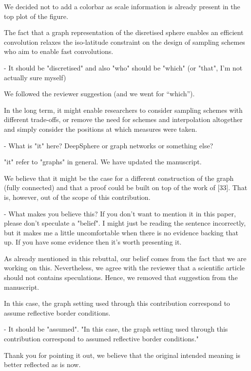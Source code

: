 \documentclass[12pt,a4paper]{article}
\newcommand{\nati}[1]{{\color[rgb]{.1,.6,.1}{NP: #1}}}
\newcommand{\TK}[1]{{\color{red}{TK: #1}}}
\newcommand{\todo}[1]{{\color[rgb]{.6,.1,.6}{TODO: #1}}}
\newcommand{\1}{\b{1}}              %
\newcommand{\0}{\b{0}}              %
\begin{document}
We decided not to add a colorbar as scale information is already present in the top plot of the figure.

\begin{mdframed}[style=comment]
The fact that a graph representation of the disretised sphere enables an efficient convolution relaxes the iso-latitude constraint on the design of sampling schemes who aim to enable fast convolutions.

- It should be "discretised" and also "who" should be "which" (or "that", I'm not actually sure myself)
\end{mdframed}
We followed the reviewer suggestion (and we went for ``which'').

\begin{mdframed}[style=comment]
In the long term, it might enable researchers to consider sampling schemes with different trade-offs, or remove the need for schemes and interpolation altogether and simply consider the positions at which measures were taken.

- What is "it" here? DeepSphere or graph networks or something else?
\end{mdframed}
"it" refer to "graphs" in general. We have updated the manuscript.

\begin{mdframed}[style=comment]
We believe that it might be the case for a different construction of the graph (fully connected) and that a proof could be built on top of the work of [33]. That is, however, out of the scope of this contribution.

- What makes you believe this? If you don't want to mention it in this paper, please don't speculate a "belief". I might just be reading the sentence incorrectly, but it makes me a little uncomfortable when there is no evidence backing that up. If you have some evidence then it's worth presenting it.
\end{mdframed}
\todo{Assign: @nati, @michael}
As already mentioned in this rebuttal, our belief comes from the fact that we are working on this.
Nevertheless, we agree with the reviewer that a scientific article should not contains speculations.
Hence, we removed that suggestion from the manuscript.

\begin{mdframed}[style=comment]
In this case, the graph setting used through this contribution correspond to assume reflective border conditions.

- It should be "assumed". "In this case, the graph setting used through this contribution correspond to assumed reflective border conditions."
\end{mdframed}
Thank you for pointing it out, we believe that the original intended meaning is better reflected as is now.
\end{document}
